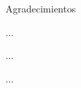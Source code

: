 \thispagestyle{empty}

\begin{acknowledge}
\vspace{-12mm}

Agradecimientos

\noindent  ...

\noindent  ...

\noindent  ...


\end{acknowledge}

 